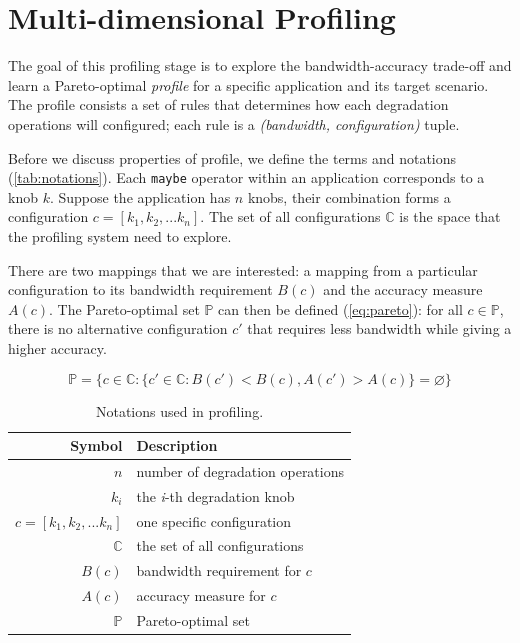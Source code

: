 \section{Multi-dimensional Profiling}
\label{sec:profiling}

The goal of this profiling stage is to explore the bandwidth-accuracy trade-off
and learn a Pareto-optimal \textit{profile} for a specific application and its
target scenario. The profile consists a set of rules that determines how each
degradation operations will configured; each rule is a \textit{(bandwidth,
  configuration)} tuple.

Before we discuss properties of profile, we define the terms and notations
(\autoref{tab:notations}). Each \texttt{maybe} operator within an application
corresponds to a knob $k$. Suppose the application has $n$ knobs, their
combination forms a configuration $c = [k_{1}, k_{2}, ... k_{n}]$. The set of
all configurations $\mathbb{C}$ is the space that the profiling system need to
explore.

There are two mappings that we are interested: a mapping from a particular
configuration to its bandwidth requirement $B(c)$ and the accuracy measure
$A(c)$. The Pareto-optimal set $\mathbb{P}$ can then be defined
(\autoref{eq:pareto}): for all $c \in \mathbb{P}$, there is no alternative
configuration $c'$ that requires less bandwidth while giving a higher accuracy.

{\small
\begin{equation}
  \mathbb{P} = \{ c \in \mathbb{C} : \{ c' \in \mathbb{C}: B(c') < B(c),
  A(c') > A(c) \} = \varnothing\}
  \label{eq:pareto}
\end{equation}
}%

\begin{table}
  \centering
  \begin{tabular}{r l}
    \toprule
    \textbf{Symbol} & \textbf{Description} \\
    \midrule
    $n$ & number of degradation operations \\
    $k_i$ & the \textit{i}-th degradation knob \\
    $c = [k_{1}, k_{2}, ... k_{n}]$ & one specific configuration \\
    $\mathbb{C}$ & the set of all configurations \\
    \midrule
    $B(c)$ & bandwidth requirement for $c$ \\
    $A(c)$ & accuracy measure for $c$ \\
    $\mathbb{P}$ & Pareto-optimal set \\
    \bottomrule
  \end{tabular}
  \caption{Notations used in profiling.}
  \label{tab:notations}
\end{table}


